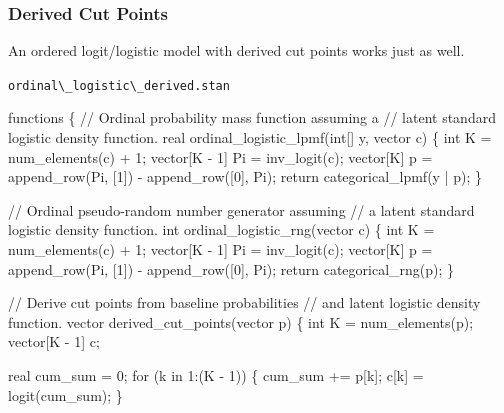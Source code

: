 \documentclass[
  letterpaper,
  DIV=11,
  numbers=noendperiod]{scrartcl}
\newenvironment{Shaded}{\begin{snugshade}}{\end{snugshade}}
\newcommand{\CommentTok}[1]{\textcolor[rgb]{0.37,0.37,0.37}{#1}}
\newcommand{\ControlFlowTok}[1]{\textcolor[rgb]{0.00,0.23,0.31}{#1}}
\newcommand{\DataTypeTok}[1]{\textcolor[rgb]{0.68,0.00,0.00}{#1}}
\newcommand{\DecValTok}[1]{\textcolor[rgb]{0.68,0.00,0.00}{#1}}
\newcommand{\KeywordTok}[1]{\textcolor[rgb]{0.00,0.23,0.31}{#1}}
\newcommand{\NormalTok}[1]{\textcolor[rgb]{0.00,0.23,0.31}{#1}}
\begin{document}
\subsubsection{Derived Cut Points}\label{derived-cut-points-1}

An ordered logit/logistic model with derived cut points works just as
well.

\begin{codelisting}

\caption{\texttt{ordinal\textbackslash\_logistic\textbackslash\_derived.stan}}

\begin{Shaded}
\begin{Highlighting}[]
\KeywordTok{functions}\NormalTok{ \{}
  \CommentTok{// Ordinal probability mass function assuming a}
  \CommentTok{// latent standard logistic density function.}
  \DataTypeTok{real}\NormalTok{ ordinal\_logistic\_lpmf(}\DataTypeTok{int}\NormalTok{[] y, }\DataTypeTok{vector}\NormalTok{ c) \{}
    \DataTypeTok{int}\NormalTok{ K = num\_elements(c) + }\DecValTok{1}\NormalTok{;}
    \DataTypeTok{vector}\NormalTok{[K {-} }\DecValTok{1}\NormalTok{] Pi = inv\_logit(c);}
    \DataTypeTok{vector}\NormalTok{[K] p = append\_row(Pi, [}\DecValTok{1}\NormalTok{]\textquotesingle{}) {-} append\_row([}\DecValTok{0}\NormalTok{]\textquotesingle{}, Pi);}
    \ControlFlowTok{return}\NormalTok{ categorical\_lpmf(y | p);}
\NormalTok{  \}}

  \CommentTok{// Ordinal pseudo{-}random number generator assuming}
  \CommentTok{// a latent standard logistic density function.}
  \DataTypeTok{int}\NormalTok{ ordinal\_logistic\_rng(}\DataTypeTok{vector}\NormalTok{ c) \{}
    \DataTypeTok{int}\NormalTok{ K = num\_elements(c) + }\DecValTok{1}\NormalTok{;}
    \DataTypeTok{vector}\NormalTok{[K {-} }\DecValTok{1}\NormalTok{] Pi = inv\_logit(c);}
    \DataTypeTok{vector}\NormalTok{[K] p = append\_row(Pi, [}\DecValTok{1}\NormalTok{]\textquotesingle{}) {-} append\_row([}\DecValTok{0}\NormalTok{]\textquotesingle{}, Pi);}
    \ControlFlowTok{return}\NormalTok{ categorical\_rng(p);}
\NormalTok{  \}}

  \CommentTok{// Derive cut points from baseline probabilities}
  \CommentTok{// and latent logistic density function.}
  \DataTypeTok{vector}\NormalTok{ derived\_cut\_points(}\DataTypeTok{vector}\NormalTok{ p) \{}
    \DataTypeTok{int}\NormalTok{ K = num\_elements(p);}
    \DataTypeTok{vector}\NormalTok{[K {-} }\DecValTok{1}\NormalTok{] c;}

    \DataTypeTok{real}\NormalTok{ cum\_sum = }\DecValTok{0}\NormalTok{;}
    \ControlFlowTok{for}\NormalTok{ (k }\ControlFlowTok{in} \DecValTok{1}\NormalTok{:(K {-} }\DecValTok{1}\NormalTok{)) \{}
\NormalTok{      cum\_sum += p[k];}
\NormalTok{      c[k] = logit(cum\_sum);}
\NormalTok{    \}}


\end{Highlighting}
\end{Shaded}
\end{codelisting}
\end{document}
